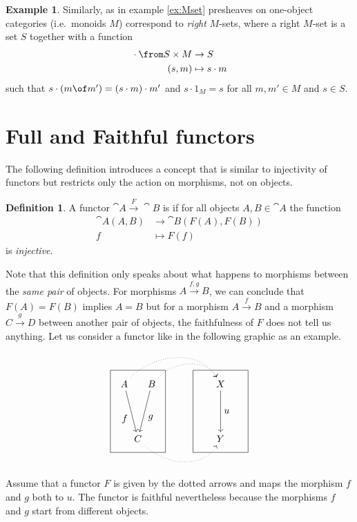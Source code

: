\documentclass{article}
\theoremstyle{definition}
\newtheorem{definition}{Definition}
\newtheorem{example}{Example}
\begin{document}
\begin{example}
  Similarly, as in example \ref{ex:Mset} presheaves on one-object categories (i.e.\ monoids $M$) correspond to \emph{right} $M$-sets, where a right $M$-set is a set $S$ together with a function
  \begin{align*}
    {} \cdot {} \from S\times M&\to S\\
    (s,m)&\mapsto s\cdot m
  \end{align*}
  such that $s\cdot (m\of m')=(s\cdot m)\cdot m'$ and $s\cdot 1_M=s$ for all $m,m'\in M$ and $s\in S$.
\end{example}


\section{Full and Faithful functors}

The following definition introduces a concept that is similar to injectivity of functors but restricts only the action on morphisms, not on objects.

\begin{definition}
  A functor $\cat{A} \xrightarrow{F} \cat{B}$ is  if for all objects $A, B \in \cat{A}$ the function
  \begin{align*}
    \cat{A}(A, B) &\to \cat{B}(F(A), F(B)) \\
    f &\mapsto F(f)
  \end{align*}
  is \emph{injective}.
\end{definition}

Note that this definition only speaks about what happens to morphisms between the \emph{same pair} of objects.
For morphisms $A \xrightarrow{f, g} B$, we can conclude that $F(A) = F(B)$ implies $A = B$ but for a morphism $A \xrightarrow{f} B$ and a morphism $C \xrightarrow{g} D$ between another pair of objects, the faithfulness of $F$ does not tell us anything.
Let us consider a functor like in the following graphic as an example.
\[ \begin{tikzpicture}
    \draw (0, 0) rectangle (2, 3);
    \node (A) at (0.5, 2.5) {$A$};
    \node (C) at (1, 0.5) {$C$};
    \node (B) at (1.5, 2.5) {$B$};
    \draw[->] (A) to node[auto, swap] {$f$} (C);
    \draw[->] (B) to node[auto] {$g$} (C);

    \draw (3, 0) rectangle (5, 3);
    \node (X) at (4, 2.5) {$X$};
    \node (Y) at (4, 0.5) {$Y$};
    \draw[->] (X) to node[auto] {$u$} (Y);

    \draw[->, dotted, out=45, in=120] (A) to (X);
    \draw[->, dotted, out=45, in=120] (B) to (X);
    \draw[->, dotted, out=-45, in=-120] (C) to (Y);
  \end{tikzpicture} \]
Assume that a functor $F$ is given by the dotted arrows and maps the morphism $f$ and $g$ both to $u$.
The functor is faithful nevertheless because the morphisms $f$ and $g$ start from different objects.
\end{document}
